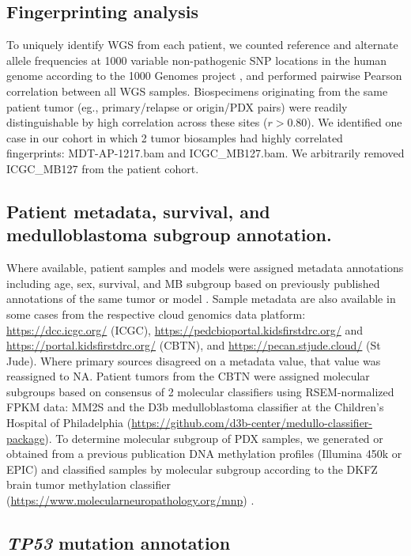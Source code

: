 \subsection{Fingerprinting analysis}
To uniquely identify WGS from each patient, we counted reference and alternate allele frequencies at 1000 variable non-pathogenic SNP locations in the human genome according to the 1000 Genomes project \cite{1000_genomes}, and performed pairwise Pearson correlation between all WGS samples. Biospecimens originating from the same patient tumor (eg., primary/relapse or origin/PDX pairs) were readily distinguishable by high correlation across these sites ($r > 0.80$). We identified one case in our cohort in which 2 tumor biosamples had highly correlated fingerprints: MDT-AP-1217.bam and ICGC\_MB127.bam. We arbitrarily removed ICGC\_MB127 from the patient cohort. 
\subsection{Patient metadata, survival, and medulloblastoma subgroup annotation.}
Where available, patient samples and models were assigned metadata annotations including age, sex, survival, and MB subgroup based on previously published annotations of the same tumor or model \cite{archer_2017,Northcott_2017,waszak_2018,rusert_2020,ivanov_2016,robinson_2012,northcott_2012}. Sample metadata are also available in some cases from the respective cloud genomics data platform: \url{https://dcc.icgc.org/} (ICGC), \url{https://pedcbioportal.kidsfirstdrc.org/} and \url{https://portal.kidsfirstdrc.org/} (CBTN), and \url{https://pecan.stjude.cloud/} (St Jude). Where primary sources disagreed on a metadata value, that value was reassigned to NA. Patient tumors from the CBTN were assigned molecular subgroups based on consensus of 2 molecular classifiers using RSEM-normalized FPKM data: MM2S \cite{gendoo_2016} and the D3b medulloblastoma classifier at the Children's Hospital of Philadelphia (\url{https://github.com/d3b-center/medullo-classifier-package}). To determine molecular subgroup of PDX samples, we generated or obtained from a previous publication \cite{rusert_2020} DNA methylation profiles (Illumina 450k or EPIC) and classified samples by molecular subgroup according to the DKFZ brain tumor methylation classifier (\url{https://www.molecularneuropathology.org/mnp}) \cite{Northcott_2017}.
\subsection{\textit{TP53} mutation annotation}
